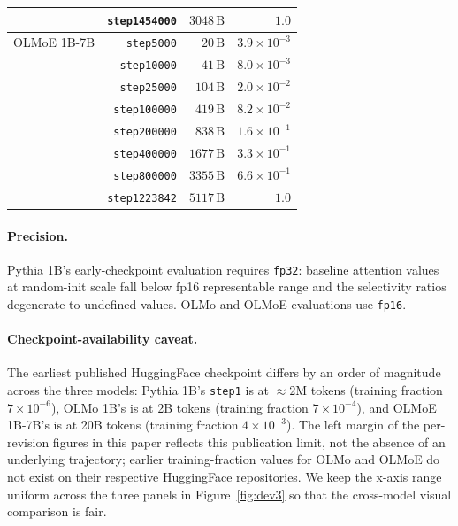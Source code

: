 \documentclass[11pt]{article}
\begin{document}
\begin{table}[t]
\begin{tabular}{l r r r}
                    & \texttt{step1454000} & $3048\,\mathrm{B}$   & $1.0$ \\
\midrule
OLMoE 1B-7B         & \texttt{step5000}    & $20\,\mathrm{B}$     & $3.9\times10^{-3}$ \\
                    & \texttt{step10000}   & $41\,\mathrm{B}$     & $8.0\times10^{-3}$ \\
                    & \texttt{step25000}   & $104\,\mathrm{B}$    & $2.0\times10^{-2}$ \\
                    & \texttt{step100000}  & $419\,\mathrm{B}$    & $8.2\times10^{-2}$ \\
                    & \texttt{step200000}  & $838\,\mathrm{B}$    & $1.6\times10^{-1}$ \\
                    & \texttt{step400000}  & $1677\,\mathrm{B}$   & $3.3\times10^{-1}$ \\
                    & \texttt{step800000}  & $3355\,\mathrm{B}$   & $6.6\times10^{-1}$ \\
                    & \texttt{step1223842} & $5117\,\mathrm{B}$   & $1.0$ \\
\bottomrule
\end{tabular}
\end{table}

\paragraph{Precision.} Pythia 1B's early-checkpoint evaluation requires
\texttt{fp32}: baseline attention values at random-init scale fall below
fp16 representable range and the selectivity ratios degenerate to
undefined values. OLMo and OLMoE evaluations use \texttt{fp16}.

\paragraph{Checkpoint-availability caveat.} The earliest published
HuggingFace checkpoint differs by an order of magnitude across the three
models: Pythia 1B's \texttt{step1} is at $\approx 2$M tokens (training
fraction $7\times10^{-6}$), OLMo 1B's is at 2B tokens (training fraction
$7\times10^{-4}$), and OLMoE 1B-7B's is at 20B tokens (training fraction
$4\times10^{-3}$). The left margin of the per-revision figures in this
paper reflects this publication limit, not the absence of an underlying
trajectory; earlier training-fraction values for OLMo and OLMoE do not
exist on their respective HuggingFace repositories. We keep the x-axis
range uniform across the three panels in Figure~\ref{fig:dev3} so that
the cross-model visual comparison is fair.
\end{document}
